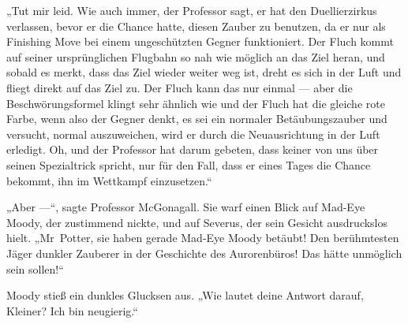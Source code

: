 „Tut mir leid. Wie auch immer, der Professor sagt, er hat den Duellierzirkus verlassen, bevor er die Chance hatte, diesen Zauber zu benutzen, da er nur als Finishing Move bei einem ungeschützten Gegner funktioniert. Der Fluch kommt auf seiner ursprünglichen Flugbahn so nah wie möglich an das Ziel heran, und sobald es merkt, dass das Ziel wieder weiter weg ist, dreht es sich in der Luft und fliegt direkt auf das Ziel zu. Der Fluch kann das nur einmal — aber die Beschwörungsformel klingt sehr ähnlich wie  und der Fluch hat die gleiche rote Farbe, wenn also der Gegner denkt, es sei ein normaler Betäubungszauber und versucht, normal auszuweichen, wird er durch die Neuausrichtung in der Luft erledigt. Oh, und der Professor hat darum gebeten, dass keiner von uns über seinen Spezialtrick spricht, nur für den Fall, dass er eines Tages die Chance bekommt, ihn im Wettkampf einzusetzen.“

„Aber —“, sagte Professor McGonagall. Sie warf einen Blick auf Mad-Eye Moody, der zustimmend nickte, und auf Severus, der sein Gesicht ausdruckslos hielt.
„Mr~Potter, sie haben gerade Mad-Eye Moody betäubt! Den berühmtesten Jäger dunkler Zauberer in der Geschichte des Aurorenbüros! Das hätte unmöglich sein sollen!“

Moody stieß ein dunkles Glucksen aus.
„Wie lautet deine Antwort darauf, Kleiner? Ich bin neugierig.“

